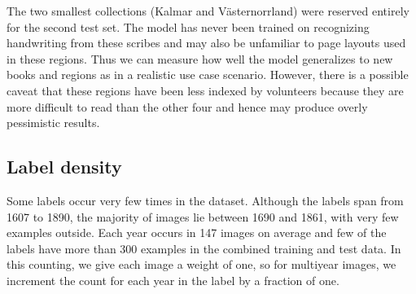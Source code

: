 
The two smallest collections (Kalmar and Västernorrland) were reserved entirely for the second test set. The model has never been trained on recognizing handwriting from these scribes and may also be unfamiliar to page layouts used in these regions. Thus we can measure how well the model generalizes to new books and regions as in a realistic use case scenario. However, there is a possible caveat that these regions have been less indexed by volunteers because they are more difficult to read than the other four and hence may produce overly pessimistic results.



\subsection{Label density} \label{sssec:few_labels}

Some labels occur very few times in the dataset. Although the labels span from 1607 to 1890, the majority of images lie between 1690 and 1861, with very few examples outside. Each year occurs in 147 images on average and few of the labels have more than 300 examples in the combined training and test data.
In this counting, we give each image a weight of one, so for multiyear images, we increment the count for each year in the label by a fraction of one.
